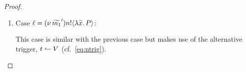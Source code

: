 \begin{proof}
\begin{enumerate}
				\noi From transition \eqref{lem:wb_is_wbc1} we conclude:
			\[
				\horel{\Gamma}{\Delta_2}{Q_1}{\Hby{\news{\widetilde{m_2}'} \bactout{n}{m_2}}}{\Delta_2'}{Q_2}
			\]
				\noi and for fresh $t$
			\[
				\horel	{\Gamma}{\Delta_1'}{\newsp{\widetilde{m_1}'}{P_2 \Par \htrigger{t}{m_1}}}
				{\hwb}
				{\Delta_2'}{\newsp{\widetilde{m_2}'}{Q_2 \Par \htrigger{t}{m_2}}}
			\]
				\noi From the  second case of this proof we can conclude that $\forall R$ with $\fpv{R} = \set{x}$:
			\[
				\begin{array}{rl}
					\Gamma; \es; &\Delta_1' \proves \newsp{\widetilde{m_1}'}{P_2 \Par \htrigger{t}{m_1}} \\
					\by{\bactinp{t}{\abs{z}{\binp{z}{x} R}}}& \newsp{\widetilde{m_1}'}{P_2 \Par \newsp{s}{\binp{s}{x} R \Par \bout{\dual{s}}{m_1} \inact }}\\
					\by{\tau} \quad &\Delta_1'' \proves \newsp{\widetilde{m_1}'}{P_2 \Par  R \subst{m_1}{x}}
				\end{array}
			\]
				\noi and
			\[
				\begin{array}{rl}
					\Gamma; \es; &\Delta_2' \proves \newsp{\widetilde{m_2}'}{Q_2 \Par \htrigger{t}{m_2} } \\
					\by{\bactinp{t}{\abs{z}{\binp{z}{x} R}}} &\newsp{\widetilde{m_2}'}{Q_2 \Par \newsp{s}{\binp{s}{x} R \Par \bout{\dual{s}}{m_2} \inact}}\\
					\by{\tau} &\Delta_2'' \proves \newsp{\widetilde{m_2}'}{Q_2 \Par  R \subst{m_2}{x}}
				\end{array}
			\]
				\noi and furthermore it is easy to see that $\forall R$ with $\fpv{R} = \set{x}$:
			\[
				\horel{\Gamma}{\Delta_1''}{\newsp{\widetilde{m_1}'}{P_2 \Par  R \subst{m_1}{x}}}{\hwb}{\Delta_2}{\newsp{\widetilde{m_2}'}{Q_2 \Par R \subst{m_2}{x}} }
			\]
				\noi as required by the definition of $\wbc$.



		\item	Case $\ell = (\nu\, \widetilde{m_1}') n ! \langle \lambda \widetilde{x}.\,P \rangle$:

				This case is similar with the previous case but makes use of the alternative trigger, $t \leftharpoonup V$ (cf.~\eqref{eq:ntrig}).


\end{enumerate}
\end{proof}
